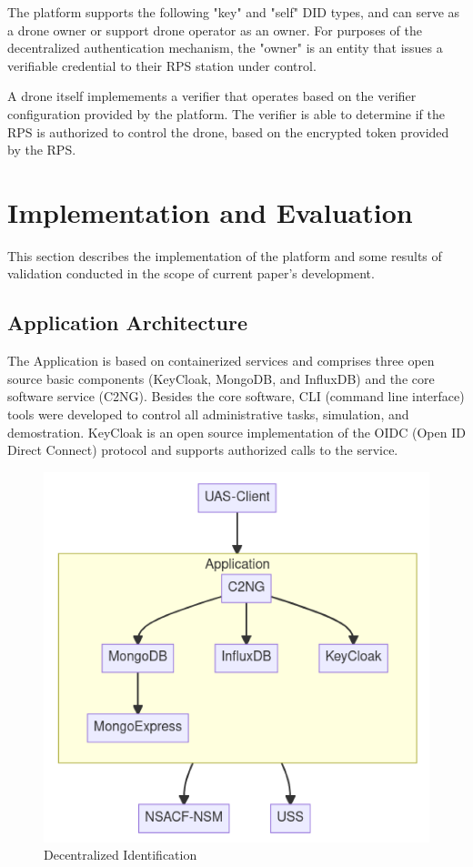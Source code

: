 \documentclass[a4paper,conference]{IEEEtran}
\begin{document}
The platform supports the following "key" and "self" DID types, and can serve as a drone owner or support drone operator as an owner. For purposes of the decentralized authentication mechanism, the "owner" is an entity that issues a verifiable credential to their RPS station under control.

A drone itself implemements a verifier that operates based on the verifier configuration provided by the platform. The verifier is able to determine if the RPS is authorized to control the drone, based on the encrypted token provided by the RPS.

\section{Implementation and Evaluation}

This section describes the implementation of the platform and some results of validation conducted in the scope of current paper's development.

\subsection{Application Architecture}

The Application is based on containerized services and comprises three open source basic components (KeyCloak, MongoDB, and InfluxDB) and the core software service (C2NG). Besides the core software, CLI (command line interface) tools were developed to control all administrative tasks, simulation, and demostration. KeyCloak is an open source implementation of the OIDC (Open ID Direct Connect) protocol and supports authorized calls to the service.

\begin{figure}[!ht]
\centering
\includegraphics[width=0.9\linewidth]{images/arch.png}
\caption{Decentralized Identification}\label{fig:arch}
\end{figure}
\end{document}
